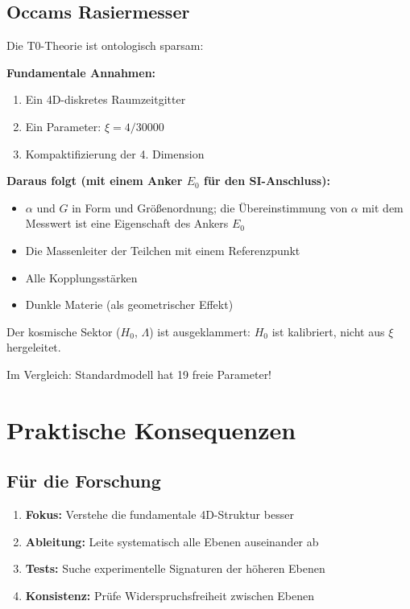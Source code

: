 	\subsection{Occams Rasiermesser}
	
	\begin{keyresult}
		Die T0-Theorie ist ontologisch sparsam:
		
		\vspace{0.3cm}
		
		\textbf{Fundamentale Annahmen:}
		\begin{enumerate}
			\item Ein 4D-diskretes Raumzeitgitter
			\item Ein Parameter: $\xi = 4/30000$
			\item Kompaktifizierung der 4. Dimension
		\end{enumerate}
		
		\vspace{0.3cm}
		
		\textbf{Daraus folgt (mit einem Anker $E_0$ für den SI-Anschluss):}
		\begin{itemize}
			\item $\alpha$ und $G$ in Form und Größenordnung; die Übereinstimmung von $\alpha$ mit dem Messwert ist eine Eigenschaft des Ankers $E_0$
			\item Die Massenleiter der Teilchen mit einem Referenzpunkt
			\item Alle Kopplungsstärken
			\item Dunkle Materie (als geometrischer Effekt)
		\end{itemize}

		Der kosmische Sektor ($H_0$, $\Lambda$) ist ausgeklammert: $H_0$ ist kalibriert, nicht aus $\xi$ hergeleitet.
		
		\vspace{0.3cm}
		
		Im Vergleich: Standardmodell hat 19 freie Parameter!
	\end{keyresult}
	
	\section{Praktische Konsequenzen}
	
	\subsection{Für die Forschung}
	
	\begin{enumerate}
		\item \textbf{Fokus:} Verstehe die fundamentale 4D-Struktur besser
		\item \textbf{Ableitung:} Leite systematisch alle Ebenen auseinander ab
		\item \textbf{Tests:} Suche experimentelle Signaturen der höheren Ebenen
		\item \textbf{Konsistenz:} Prüfe Widerspruchsfreiheit zwischen Ebenen
	\end{enumerate}
	

